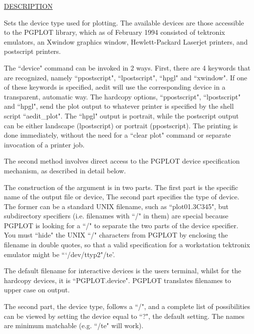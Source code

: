 \underline{DESCRIPTION}
\begin{list}{}{\setlength{\leftmargin}{0.5in}
     \setlength{\rightmargin}{0in}}
\item
Sets the device type used for plotting.  The available devices
are those accessible to the PGPLOT library, which as of February
1994 consisted of tektronix emulators, an Xwindow graphics window,
Hewlett-Packard Laserjet printers, and postscript printers.
\item
The ``device" command can be invoked in 2 ways.  First, there
are 4 keywords that are recognized, namely ``ppostscript", 
``lpostscript", ``hpgl" and ``xwindow".  If one of these keywords is 
specified, aedit will use the corresponding device in a transparent,
automatic way.  The hardcopy options, ``ppostscript", ``lpostscript"
and ``hpgl", send the plot output to whatever printer is specified
by the shell script ``aedit\_plot".  The ``hpgl" output is portrait,
while the postscript output can be either landscape (lpostscript)
or portrait (ppostscript).  The printing is done immediately, 
without the need for a ``clear plot" command or separate invocation 
of a printer job.
\item
The second method involves direct access to the PGPLOT device
specification mechanism, as described in detail below.
\item
The construction of the argument is in two parts.  The first
part is the specific name of the output file or device,  The
second part specifies the type of device.  The former can
be a standard UNIX filename, such as ``plot01.3C345", but 
subdirectory specifiers (i.e. filenames with ``/" in them) are
special because PGPLOT is looking for a ``/" to separate
the two parts of the device specifier.  You must ``hide" the
UNIX ``/" characters from PGPLOT by enclosing the filename in
double quotes, so that a valid specification for a workstation
tektronix emulator might be ```/dev/ttyp2"/te'.
\item
The default filename for interactive devices is the users
terminal, whilst for the hardcopy devices, it is ``PGPLOT.device".
PGPLOT translates filenames to upper case on output.
\item
The second part, the device type, follows a ``/", and a complete
list of possibilities can be viewed by setting the device equal
to ``?", the default setting.  The names are minimum matchable 
(e.g. ``/te" will work).  
\end{list}
\vspace{.2in}

